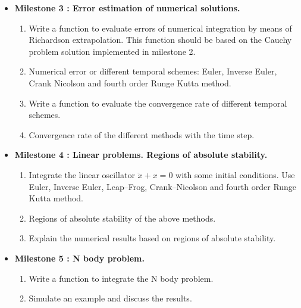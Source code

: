 \documentclass[12pt, a4paper]{article}
\begin{document}
\begin{itemize}
\begin{enumerate}
\end{enumerate} 



\item {\bf Milestone 3 : Error estimation of numerical solutions.} 


\begin{enumerate}

\item Write a function to evaluate errors of numerical integration by means of Richardson 
extrapolation. 
This function should be based on the Cauchy problem solution implemented in milestone 2. 
\item Numerical error or different temporal schemes:  
Euler, Inverse Euler, Crank Nicolson 
and  fourth order Runge Kutta method.  
\item Write a function to evaluate the convergence rate of different temporal schemes. 
\item Convergence rate of the different methods with the time step.   

\end{enumerate} 


\item {\bf Milestone 4 : Linear problems. Regions of absolute stability.}  
  \begin{enumerate}
\item  Integrate the linear oscillator $ \ddot x+ x =0$ with some initial conditions.  
       Use Euler, Inverse Euler, Leap--Frog, Crank--Nicolson and fourth order Runge Kutta
        method.  
\item Regions of absolute stability of the above methods. 
\item Explain the numerical results based on regions of absolute stability.
\end{enumerate}
 

\newpage
\item {\bf Milestone 5 : N  body problem.}    

 \begin{enumerate} 
    
     \item Write a function to integrate the N body problem.  
     \item Simulate an example and discuss the results. 
 \end{enumerate}





\end{itemize}
\end{document}

